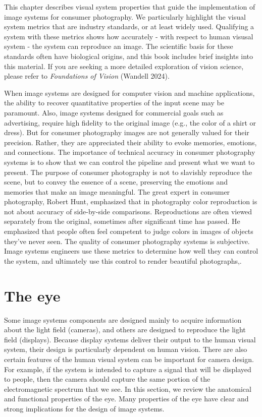 \documentclass[
  letterpaper,
]{book}
\begin{document}
This chapter describes visual system properties that guide the
implementation of image systems for consumer photography. We
particularly highlight the visual system metrics that are industry
standards, or at least widely used. Qualifying a system with these
metrics shows how accurately - with respect to human visusal system -
the system can reproduce an image. The scientific basis for these
standards often have biological origins, and this book includes brief
insights into this material. If you are seeking a more detailed
exploration of vision science, please refer to \emph{Foundations of
Vision} (Wandell 2024).

When image systems are designed for computer vision and machine
applications, the ability to recover quantitative properties of the
input scene may be paramount. Also, image systems designed for
commercial goals such as advertising, require high fidelity to the
original image (e.g., the color of a shirt or dress). But for consumer
photography images are not generally valued for their precision. Rather,
they are appreciated their ability to evoke memories, emotions, and
connections. The importance of technical accuracy in consumer
photography systems is to show that we can control the pipeline and
present what we want to present. The purpose of consumer photography is
not to slavishly reproduce the scene, but to convey the essence of a
scene, preserving the emotions and memories that make an image
meaningful. The great expert in consumer photography, Robert Hunt,
emphasized that in photography color reproduction is not about accuracy
of side-by-side comparisons. Reproductions are often viewed separately
from the original, sometimes after significant time has passed. He
emphasized that people often feel competent to judge colors in images of
objects they've never seen. The quality of consumer photography systems
is subjective. Image systems engineers use these metrics to determine
how well they can control the system, and ultimately use this control to
render beautiful photographs,.

\section{The eye}\label{the-eye}

Some image systems components are designed mainly to acquire information
about the light field (cameras), and others are designed to reproduce
the light field (displays). Because display systems deliver their output
to the human visual system, their design is particularly dependent on
human vision. There are also certain features of the human visual system
can be important for camera design. For example, if the system is
intended to capture a signal that will be displayed to people, then the
camera should capture the same portion of the electromagnetic spectrum
that we see. In this section, we review the anatomical and functional
properties of the eye. Many properties of the eye have clear and strong
implications for the design of image systems.
\end{document}
